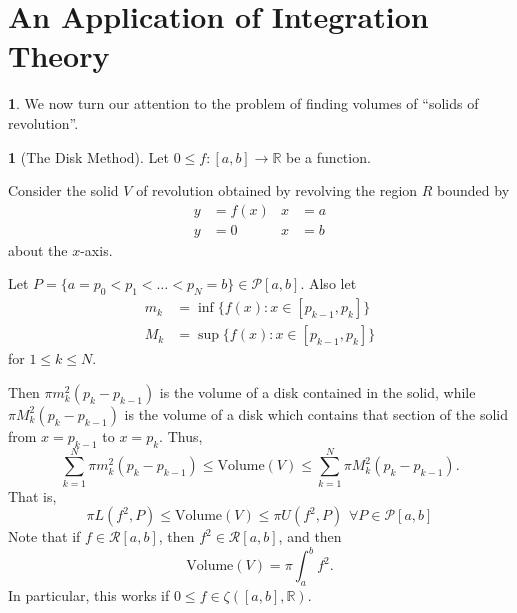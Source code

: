 \documentclass[11pt]{article}
\theoremstyle{definition}
\newtheorem{none}[thm]{}
\newcommand{\mbR}{\ensuremath{\mathbb{R}}}
\begin{document}
\section{An Application of Integration Theory}

\begin{none}
We now turn our attention to the problem of finding volumes of ``solids of revolution''.
\end{none}

\begin{none}[The Disk Method]
Let $0 \leq f : [a, b] \to \mbR$ be a function. 

Consider the solid $V$ of revolution obtained by revolving the region $R$ bounded by
\[\begin{aligned}
y & = f(x) & x & = a \\
y & = 0 & x & = b 
\end{aligned}\]
about the $x$-axis. 

Let $P = \{a = p_0 < p_1 < \dots < p_N = b\} \in \mathcal{P}[a, b]$. Also let
\begin{align*}
m_k & = \inf\{f(x) : x \in [p_{k-1}, p_k]\} \\
M_k & = \sup\{f(x) : x \in [p_{k-1}, p_k]\}
\end{align*}
for $1 \leq k \leq N$. 

Then $\pi m_k^2(p_k - p_{k-1})$ is the volume of a disk contained in the solid, while $\pi M_k^2(p_k - p_{k-1})$ is the volume of a disk which contains that section of the solid from $x = p_{k-1}$ to $x = p_k$. Thus,
$$\sum_{k=1}^N \pi m_k^2 (p_k - p_{k-1}) \leq \text{Volume}(V) \leq \sum_{k=1}^N \pi M_k^2 (p_k - p_{k-1}) \text{.}$$
That is,
$$\pi L(f^2, P) \leq \text{Volume}(V) \leq \pi U(f^2, P) \hspace{5pt} \forall P \in \mathcal{P}[a, b]$$
Note that if $f \in \mathcal{R}[a, b]$, then $f^2 \in \mathcal{R}[a, b]$, and then
$$\text{Volume}(V) = \pi \int_a^b f^2 \text{.}$$
In particular, this works if $0 \leq f \in \zeta\left([a, b], \mbR\right)$. 
\end{none}
\end{document}
